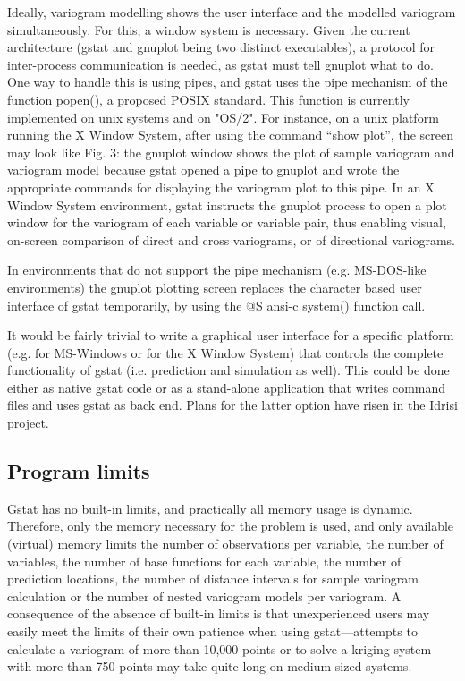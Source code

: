 \documentclass{article}
\begin{document}
Ideally, variogram modelling shows the user interface and the modelled
variogram simultaneously. For this, a window system is necessary. Given
the current architecture (gstat and gnuplot being two distinct
executables), a protocol for inter-process communication is needed, as
gstat must tell gnuplot what to do. One way to handle this is using
pipes, and gstat uses the pipe mechanism of the function popen(), a
proposed POSIX standard. This function is currently implemented on unix
systems and on "OS/2". For instance, on a unix platform running the X
Window System, after using the command ``show plot'', the screen may
look like Fig. 3: the gnuplot window shows the plot of sample variogram
and variogram model because gstat opened a pipe to gnuplot and wrote the
appropriate commands for displaying the variogram plot to this pipe. In
an X Window System environment, gstat instructs the gnuplot process to
open a plot window for the variogram of each variable or variable pair,
thus enabling visual, on-screen comparison of direct and cross
variograms, or of directional variograms.

In environments that do not support the pipe mechanism (e.g. MS-DOS-like
environments) the gnuplot plotting screen replaces the character based
user interface of gstat temporarily, by using the @S ansi-c system()
function call.

It would be fairly trivial to write a graphical user interface for a
specific platform (e.g. for MS-Windows or for the X Window System) that
controls the complete functionality of gstat (i.e.  prediction and
simulation as well). This could be done either as native gstat code or
as a stand-alone application that writes command files and uses gstat as
back end. Plans for the latter option have risen in the Idrisi project.

\subsection{Program limits}
Gstat has no built-in limits, and practically all memory usage is
dynamic. Therefore, only the memory necessary for the problem is used,
and only available (virtual) memory limits the number of observations
per variable, the number of variables, the number of base functions for
each variable, the number of prediction locations, the number of
distance intervals for sample variogram calculation or the number of
nested variogram models per variogram. A consequence of the absence of
built-in limits is that unexperienced users may easily meet the limits
of their own patience when using gstat---attempts to calculate a
variogram of more than 10,000 points or to solve a kriging system with
more than 750 points may take quite long on medium sized systems.
\end{document}

